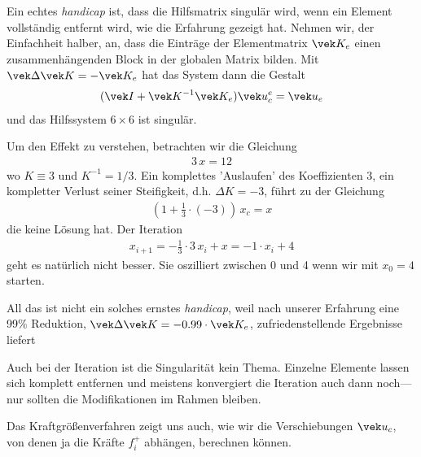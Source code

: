 Ein echtes {\em handicap\/} ist, dass die Hilfsmatrix singul\"{a}r wird, wenn ein Element vollst\"{a}ndig entfernt wird, wie die Erfahrung gezeigt hat. Nehmen wir, der Einfachheit halber, an, dass die Eintr\"{a}ge der Elementmatrix $\vek K_e$ einen zusammenh\"{a}ngenden Block in der globalen Matrix bilden. Mit $\vek \Delta \vek K = - \vek K_e$ hat das System dann die Gestalt
\begin{align}
(\vek I + \vek K^{-1} \vek K_e) \vek u_c^e = \vek u_e
\end{align}
und das Hilfssystem $6 \times 6$ ist singul\"{a}r.

Um den Effekt zu verstehen, betrachten wir die Gleichung
\begin{align}
3\,x = 12
\end{align}
wo $K \equiv 3$ und $ K^{-1} = 1/3$. Ein komplettes 'Auslaufen' des Koeffizienten 3, ein kompletter Verlust seiner Steifigkeit, d.h. $\Delta K = - 3$, f\"{u}hrt zu der Gleichung
\begin{align}
(1 + \frac{1}{3} \cdot (-3)) \,x_c = x
\end{align}
die keine L\"{o}sung hat. Der Iteration
\begin{align}
x_{i+1} = - \frac{1}{3}\cdot 3\,x_i + x = - 1 \cdot x_i + 4
\end{align}
geht es nat\"{u}rlich nicht besser. Sie oszilliert zwischen 0 und 4 wenn wir mit $x_0 = 4$ starten.

All das ist nicht ein solches ernstes {\em handicap\/}, weil nach unserer Erfahrung eine 99\% Reduktion, $\vek \Delta \vek K = -0.99 \cdot \vek K_e$, zufriedenstellende Ergebnisse liefert

Auch bei der Iteration ist die Singularit\"{a}t kein Thema. Einzelne Elemente lassen sich komplett entfernen und meistens konvergiert die Iteration auch dann noch---nur sollten die Modifikationen im Rahmen bleiben.

Das Kraftgr\"{o}{\ss}enverfahren zeigt uns auch, wie wir die Verschiebungen $\vek u_c$, von denen ja die Kr\"{a}fte $f_i^+$ abh\"{a}ngen, berechnen k\"{o}nnen.

